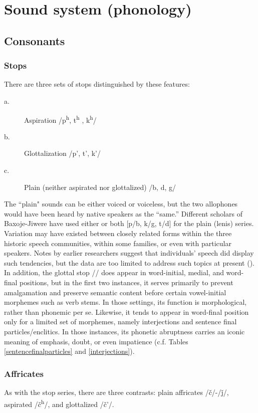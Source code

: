 \documentclass[output=paper]{LSP/langsci}
\begin{document}
\section {Sound system (phonology)}	
		
\subsection{Consonants} 		     	                     	
\subsubsection{Stops} There are three sets of stops distinguished by these features: 	     
\begin{description}
\item[a.] Aspiration  /p\textsuperscript{h}, t\textsuperscript{h} , k\textsuperscript{h}/
\item[b.] Glottalization /p', t', k'/
\item[c.] Plain (neither aspirated nor glottalized) /b, d, g/	
\end{description}   		         		
The ``plain" sounds can be either voiced or voiceless, but the two allophones would have been heard by native speakers as the ``same.''  Different scholars of Baxoje-Jiwere have used either or both [p/b, k/g, t/d] for the plain (lenis) series. Variation may have existed between closely related forms within the three historic speech communities, within some families, or even with particular speakers.  Notes by earlier researchers suggest that individuals' speech did display such tendencies, but the data are too limited to address such topics at present (\citealt{Whitman1947}). In addition, the glottal stop // does appear in word-initial, medial, and word-final positions, but in the first two instances, it serves primarily to prevent amalgamation and preserve semantic content before certain vowel-initial morphemes such as verb stems.  In those settings, its function is morphological, rather than phonemic per se. Likewise, it tends to appear in word-final position only for a limited set of morphemes, namely interjections and sentence final particles/enclitics.  In those instances, its phonetic abruptness carries an iconic meaning of emphasis, doubt, or even impatience (c.f. Tables \ref{sentencefinalparticles} and \ref{interjections}). 

\subsubsection{Affricates}  As with the stop series, there are three contrasts:  plain affricates /\v{c}/-/\v{j}/, aspirated /\v{c}\textsuperscript{h}/,  and glottalized /\v{c}'/. 
\end{document}
